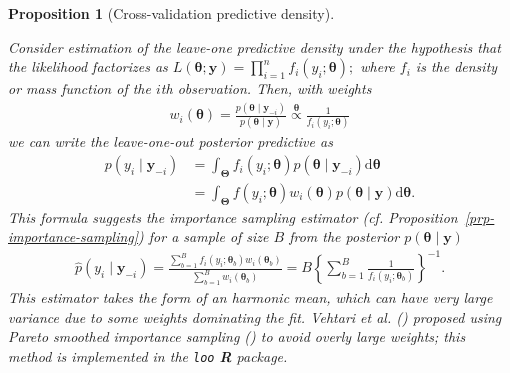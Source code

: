 \documentclass[
  11pt,
  letterpaper,
]{scrbook}
\theoremstyle{definition}
\theoremstyle{plain}
\newtheorem{proposition}{Proposition}[chapter]
\theoremstyle{plain}
\theoremstyle{plain}
\theoremstyle{definition}
\theoremstyle{definition}
\theoremstyle{plain}
\newtheorem{proposition}{Proposition}[chapter]
\theoremstyle{plain}
\theoremstyle{remark}
\begin{document}
\begin{proposition}[Cross-validation predictive
density]\protect\hypertarget{prp-cv-predictive-dens}{}\label{prp-cv-predictive-dens}

Consider estimation of the leave-one predictive density under the
hypothesis that the likelihood factorizes as
\(L(\boldsymbol{\theta}; \boldsymbol{y}) = \prod_{i=1}^n f_i(y_i; \boldsymbol{\theta});\)
where \(f_i\) is the density or mass function of the \(i\)th
observation. Then, with weights \begin{align*}
w_i(\boldsymbol{\theta}) = \frac{p(\boldsymbol{\theta} \mid \boldsymbol{y}_{-i})}{p(\boldsymbol{\theta} \mid \boldsymbol{y})} \stackrel{\boldsymbol{\theta}}{\propto} \frac{1}{f_i(y_i; \boldsymbol{\theta})}
\end{align*} we can write the leave-one-out posterior predictive as
\begin{align*}
p(y_i \mid \boldsymbol{y}_{-i}) &= \int_{\boldsymbol{\Theta}} f_i(y_i; \boldsymbol{\theta}) p(\boldsymbol{\theta} \mid \boldsymbol{y}_{-i}) \mathrm{d} \boldsymbol{\theta}
\\& = \int_{\boldsymbol{\Theta}} f(y_i; \boldsymbol{\theta}) w_i(\boldsymbol{\theta}) p(\boldsymbol{\theta} \mid \boldsymbol{y}) \mathrm{d} \boldsymbol{\theta}.
\end{align*} This formula suggests the importance sampling estimator
(cf. Proposition~\ref{prp-importance-sampling}) for a sample of size
\(B\) from the posterior \(p(\boldsymbol{\theta} \mid \boldsymbol{y})\)
\begin{align*}
\widehat{p}(y_i \mid \boldsymbol{y}_{-i}) = \frac{\sum_{b=1}^B f_i(y_i; \boldsymbol{\theta}_b) w_i(\boldsymbol{\theta}_b)}{\sum_{b=1}^Bw_i(\boldsymbol{\theta}_b)}  = B \left\{\sum_{b=1}^B \frac{1}{f_i (y_i; \boldsymbol{\theta}_b)}\right\}^{-1}.
\end{align*} This estimator takes the form of an harmonic mean, which
can have very large variance due to some weights dominating the fit.
Vehtari et al. () proposed
using Pareto smoothed importance sampling
() to avoid overly large weights; this method is implemented in the
\texttt{loo} \textbf{R} package.


\end{proposition}
\end{document}
